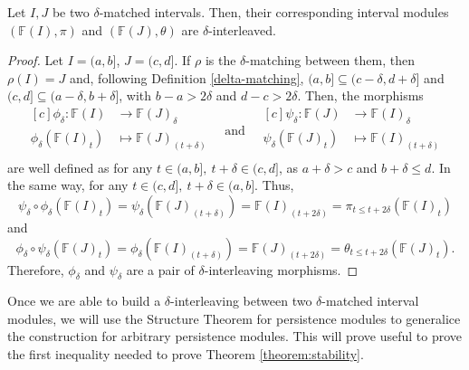 \begin{lemma} \cite[Exercise 2.2.7]{polterovich} \label{interval-interleaving-if-matching}
    Let $ I, J $ be two $\delta$-matched intervals. Then, their corresponding interval modules $ (\mathbb F (I), \pi) $ and $( \mathbb F (J), \theta) $ are $\delta$-interleaved.
\end{lemma}
\begin{proof}
    Let $ I = (a, b] $, $ J = (c, d] $. If $\rho$ is the $\delta$-matching between them, then $ \rho(I) = J $ and, following Definition \ref{delta-matching}, $ (a, b] \subseteq (c-\delta, d+\delta] $ and $ (c, d] \subseteq (a-\delta, b+\delta] $, with $ b - a > 2\delta $ and $ d - c > 2\delta $. Then, the morphisms
    \begin{equation*}
        \begin{aligned}[c]
        \phi_\delta\colon \mathbb F(I) &\to \mathbb F(J)_\delta\\
        \phi_\delta(\mathbb F(I)_t) &\mapsto \mathbb F(J)_{(t+\delta)}\\
        \end{aligned}
        \quad \text{and} \quad
        \begin{aligned}[c]
        \psi_\delta\colon \mathbb F(J) &\to \mathbb F(I)_\delta\\
        \psi_\delta(\mathbb F(J)_t) &\mapsto \mathbb F(I)_{(t+\delta)}\\
        \end{aligned}
    \end{equation*}
    are well defined as for any $ t \in (a,b], \ t + \delta \in (c, d] $, as $ a + \delta > c $ and $ b + \delta \leq d $. In the same way, for any $ t \in (c,d], \ t + \delta \in (a, b] $. Thus,
    $$
        \psi_\delta \circ \phi_\delta (\mathbb F(I)_t) = \psi_\delta(\mathbb F(J)_{(t+\delta)}) = \mathbb F(I)_{(t+2\delta)} = \pi_{t \leq t+2\delta}(\mathbb F(I)_t)
    $$ and
    $$ \phi_\delta \circ \psi_\delta (\mathbb F(J)_t) = \phi_\delta(\mathbb F(I)_{(t+\delta)}) = \mathbb F(J)_{(t+2\delta)} = \theta_{t \leq t+2\delta}(\mathbb F(J)_t). $$
    Therefore, $ \phi_\delta $ and $ \psi_\delta $ are a pair of $\delta$-interleaving morphisms.
\end{proof}

Once we are able to build a $\delta$-interleaving between two $\delta$-matched interval modules, we will use the Structure Theorem for persistence modules to generalice the construction for arbitrary persistence modules. This will prove useful to prove the first inequality needed to prove Theorem \ref{theorem:stability}.

